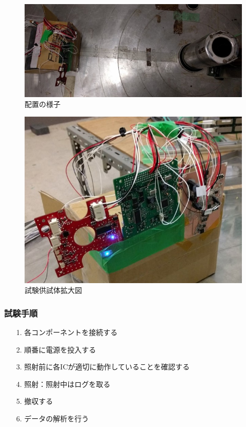 \begin{figure}[H]
	\centering
	\includegraphics[scale=0.9]{04/fig/4-1-1.jpg}
	\caption{配置の様子}
	\label{fig4-1-1}
\end{figure}
\begin{figure}[H]
	\centering
	\includegraphics[scale=0.9]{04/fig/4-1-2.jpg}
	\caption{試験供試体拡大図}
\label{fig4-1-2}
\end{figure}

\subsubsection{試験手順}
\begin{itemize}
	\item[　1.　] 各コンポーネントを接続する
	\item[　2.　]  順番に電源を投入する
	\item[　3.　]  照射前に各ICが適切に動作していることを確認する
	\item[　4.　]  照射：照射中はログを取る
	\item[　5.　]  撤収する
	\item[　6.　]  データの解析を行う
\end{itemize}

